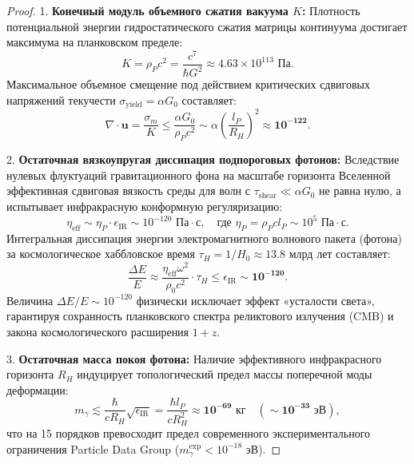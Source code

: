 \documentclass[12pt,a4paper]{article}
\begin{document}
	\begin{proof}
		1. \textbf{Конечный модуль объемного сжатия вакуума $K$:}
		Плотность потенциальной энергии гидростатического сжатия матрицы континуума достигает максимума на планковском пределе:
		\begin{equation}
			K = \rho_P c^2 = \frac{c^7}{\hbar G^2} \approx 4.63 \times 10^{113} \text{ Па}.
		\end{equation}
		Максимальное объемное смещение под действием критических сдвиговых напряжений текучести $\sigma_{\text{yield}} = \alpha G_0$ составляет:
		\begin{equation}
			\nabla \cdot \mathbf{u} = \frac{\sigma_m}{K} \le \frac{\alpha G_0}{\rho_P c^2} \sim \alpha \left( \frac{l_P}{R_H} \right)^2 \approx \mathbf{10^{-122}}.
		\end{equation}
		
		2. \textbf{Остаточная вязкоупругая диссипация подпороговых фотонов:}
		Вследствие нулевых флуктуаций гравитационного фона на масштабе горизонта Вселенной эффективная сдвиговая вязкость среды для волн с $\tau_{\text{shear}} \ll \alpha G_0$ не равна нулю, а испытывает инфракрасную конформную регуляризацию:
		\begin{equation}
			\eta_{\text{eff}} \sim \eta_P \cdot \epsilon_{\text{IR}} \sim 10^{-120} \text{ Па}\cdot\text{с}, \quad \text{где } \eta_P = \rho_P c l_P \sim 10^5 \text{ Па}\cdot\text{с}.
		\end{equation}
		Интегральная диссипация энергии электромагнитного волнового пакета (фотона) за космологическое хаббловское время $\tau_H = 1/H_0 \approx 13.8$ млрд лет составляет:
		\begin{equation}
			\frac{\Delta E}{E} \approx \frac{\eta_{\text{eff}} \omega^2}{\rho_0 c^2} \cdot \tau_H \le \epsilon_{\text{IR}} \sim \mathbf{10^{-120}}.
		\end{equation}
		Величина $\Delta E / E \sim 10^{-120}$ физически исключает эффект «усталости света», гарантируя сохранность планковского спектра реликтового излучения (CMB) и закона космологического расширения $1+z$.
		
		3. \textbf{Остаточная масса покоя фотона:}
		Наличие эффективного инфракрасного горизонта $R_H$ индуцирует топологический предел массы поперечной моды деформации:
		\begin{equation}
			m_\gamma \lesssim \frac{\hbar}{c R_H} \sqrt{\epsilon_{\text{IR}}} = \frac{\hbar l_P}{c R_H^2} \approx \mathbf{10^{-69} \text{ кг}} \quad (\sim \mathbf{10^{-33} \text{ эВ}}),
		\end{equation}
		что на 15 порядков превосходит предел современного экспериментального ограничения Particle Data Group ($m_\gamma^{\text{exp}} < 10^{-18}$ эВ).
	\end{proof}
		
\end{document}
